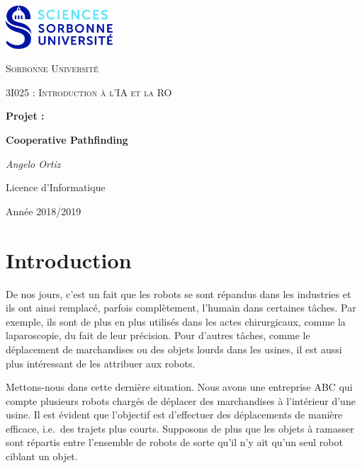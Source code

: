 \documentclass[12pt,a4paper]{article}
\begin{document}
\begin{titlepage}
	\centering
	\includegraphics[width=0.30\textwidth]{logo.jpg}\par\vspace{1cm}
	{\scshape\LARGE Sorbonne Universit\'e \par}
	\vspace{1cm}
	{\scshape\Large 3I025 : Introduction \`a l'IA et la RO\par}
	\vspace{1.5cm}
	{\Large \bfseries Projet :\par}
	{\huge\bfseries Cooperative Pathfinding\par}
	\vspace{2cm}
	{\Large\itshape Angelo Ortiz\par}
	
	\vfill

	{\large Licence d'Informatique\par}
	{\large Ann\'ee 2018/2019\par}
\end{titlepage}


\tableofcontents
\listoffigures
\listoftables

\newpage

\part*{Introduction}

De nos jours, c'est un fait que les robots se sont r\'epandus dans les industries et ils ont ainsi remplac\'e, parfois compl\`etement, l'humain dans certaines t\^aches. 
Par exemple, ils sont de plus en plus utilis\'es dans les actes chirurgicaux, comme la laparoscopie, du fait de leur pr\'ecision. Pour d'autres t\^aches, comme le d\'eplacement de marchandises ou des objets lourds dans les usines, il est aussi plus int\'eressant de les attribuer aux robots.

Mettons-nous dans cette derni\`ere situation. Nous avons une entreprise ABC qui compte plusieurs robots charg\'es de d\'eplacer des marchandises \`a l'int\'erieur d'une usine. 
Il est \'evident que l'objectif est d'effectuer des d\'eplacements de mani\`ere efficace, i.e.\ des trajets plus courts. 
Supposons de plus que les objets \`a ramasser sont r\'epartis entre l'ensemble de robots de sorte qu'il n'y ait qu'un seul robot ciblant un objet.
\end{document}

